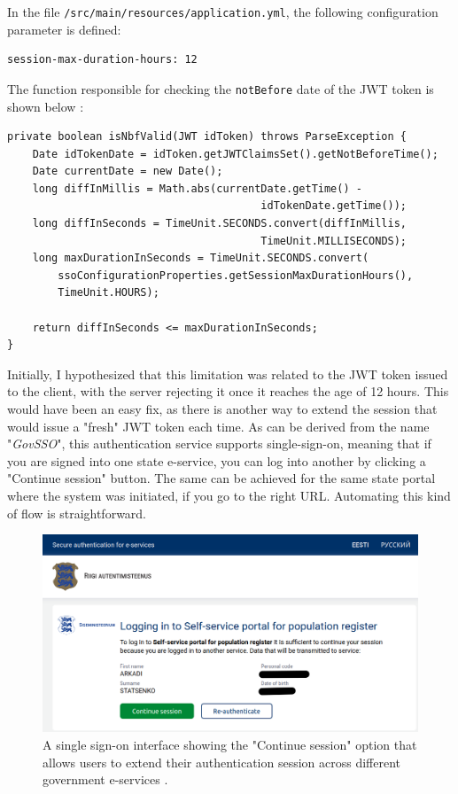 In the file \texttt{/src/main/resources/application.yml}, the following configuration parameter is defined:

\begin{small}
\begin{verbatim}
session-max-duration-hours: 12
\end{verbatim}
\end{small}

The function responsible for checking the \texttt{notBefore} date of the JWT token is shown below \cite{govsso-session-hydra}:

\begin{small}
\begin{verbatim}
private boolean isNbfValid(JWT idToken) throws ParseException {
    Date idTokenDate = idToken.getJWTClaimsSet().getNotBeforeTime();
    Date currentDate = new Date();
    long diffInMillis = Math.abs(currentDate.getTime() -
                                        idTokenDate.getTime());
    long diffInSeconds = TimeUnit.SECONDS.convert(diffInMillis, 
                                        TimeUnit.MILLISECONDS);
    long maxDurationInSeconds = TimeUnit.SECONDS.convert(
        ssoConfigurationProperties.getSessionMaxDurationHours(), 
        TimeUnit.HOURS);

    return diffInSeconds <= maxDurationInSeconds;
}
\end{verbatim}
\end{small}

Initially, I hypothesized that this limitation was related to the JWT token issued to the client, with the server rejecting it once it reaches the age of 12 hours. This would have been an easy fix, as there is another way to extend the session that would issue a "fresh" JWT token each time. As can be derived from the name "\textit{GovSSO}", this authentication service supports single-sign-on, meaning that if you are signed into one state e-service, you can log into another by clicking a "Continue session" button. The same can be achieved for the same state portal where the system was initiated, if you go to the right URL. Automating this kind of flow is straightforward.

\begin{figure}[H]
\centering
\includegraphics[width=450px]{english/figures/Screenshot from 2025-08-08 20-37-42.png}
\caption{A single sign-on interface showing the "Continue session" option that allows users to extend their authentication session across different government e-services \cite{eesti-ee-screenshot}.}
\label{fig:eesti-ee-continue-session}
\end{figure}

